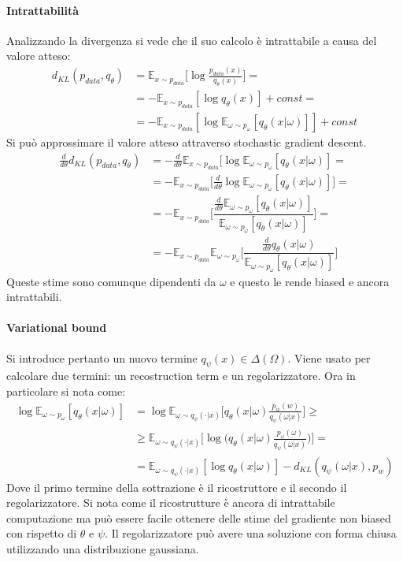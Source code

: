 		\paragraph{Intrattabilit\`a}
		Analizzando la divergenza si vede che il suo calcolo \`e intrattabile a causa del valore atteso:
		\begin{align*}
			d_{KL}(p_{data}, q_\theta) &= \mathbb{E}_{x\sim p_{data}}\bigl[\log\frac{p_{data}(x)}{q_\theta(x)}\bigr]=\\
			& = -\mathbb{E}_{x\sim p_{data}}[\log q_\theta(x)] + const=\\
			&= -\mathbb{E}_{x\sim p_{data}}[\log\mathbb{E}_{\omega\sim p_\omega} [q_\theta(x|\omega)]]+const
		\end{align*}
		Si pu\`o approssimare il valore atteso attraverso stochastic gradient descent.
		\begin{align*}
			\frac{d}{d\theta}d_{KL}(p_{data},q_\theta) &= -\frac{d}{d\theta}\mathbb{E}_{x\sim p_{data}}[\log\mathbb{E}_{\omega\sim p_\omega}[q_\theta(x|\omega)]=\\
			& = -\mathbb{E}_{x\sim p_{data}}\bigl[\frac{d}{d\theta}\log\mathbb{E}_{\omega\sim p_\omega}[q_\theta(x|\omega)]\bigr]=\\
			& = - \mathbb{E}_{x\sim p_{data}}\biggl[\dfrac{\frac{d}{d\theta}\mathbb{E}_{\omega\sim p_\omega}[q_\theta(x|\omega)]}{\mathbb{E}_{\omega\sim p_\omega}[q_\theta(x|\omega)]}\biggr]=\\
			& = - \mathbb{E}_{x\sim p_{data}}\mathbb{E}_{\omega\sim p_\omega}\biggl[\dfrac{\frac{d}{d\theta}q_\theta(x|\omega)}{\mathbb{E}_{\omega\sim p_\omega}[q_\theta(x|\omega)]}\biggr]
		\end{align*}
		Queste stime sono comunque dipendenti da $\omega$ e questo le rende biased e ancora intrattabili.
		
		\paragraph{Variational bound}
		Si introduce pertanto un nuovo termine $q_\psi(x)\in\Delta(\Omega)$.
		Viene usato per calcolare due termini: un recostruction term e un regolarizzatore.
		Ora in particolare si nota come:
		\begin{align*}
			\log\mathbb{E}_{\omega\sim p_\omega} [q_\theta(x|\omega)] &= \log\mathbb{E}_{\omega\sim q_\psi(\cdot|x)}\bigl[q_\theta(x|\omega)\frac{p_w(w)}{q_\psi(\omega|x)}\bigr]\ge\\
			&\ge \mathbb{E}_{\omega\sim q_\psi(\cdot|x)}\bigl[\log\bigl(q_\theta(x|\omega)\frac{p_\omega(\omega)}{q_\psi(\omega|x)}\bigr)\bigr]=\\
			&=\mathbb{E}_{\omega\sim q_\psi(\cdot|x)}[\log q_\theta(x|\omega)] - d_{KL}(q_\psi(\omega|x), p_w)
		\end{align*}
		Dove il primo termine della sottrazione \`e il ricostruttore e il secondo il regolarizzatore.
		Si nota come il ricostrutture \`e ancora di intrattabile computazione ma pu\`o essere facile ottenere delle stime del gradiente non biased con rispetto di $\theta$ e $\psi$.
		Il regolarizzatore pu\`o avere una soluzione con forma chiusa utilizzando una distribuzione gaussiana.
		
